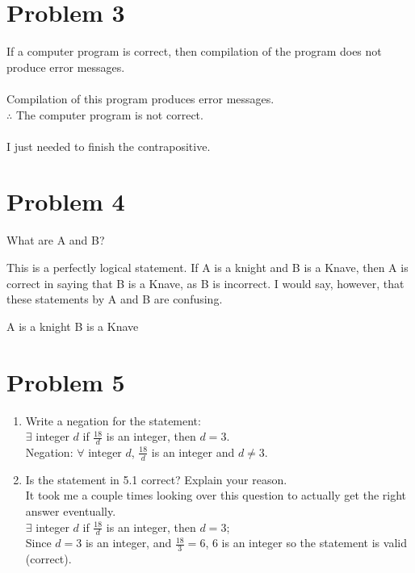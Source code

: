\documentclass[11pt]{article}
\begin{document}
\newpage

\section*{Problem 3}
    \quad If a computer program is correct, then compilation of the program does not produce error messages.\\\\
    Compilation of this program produces error messages. \\
    $\therefore$ The computer program is not correct.\\\\
    I just needed to finish the contrapositive.

\newpage

\section*{Problem 4}
\begin{center}
    What are A and B?
\end{center}
This is a perfectly logical statement. If A is a knight and B is a Knave, then A is correct in saying that B is a Knave, as B is incorrect. I would say, however, that these statements by A and B are confusing. \\
\begin{center}
    A is a knight \quad B is a Knave
\end{center}

\newpage

\section*{Problem 5}
\begin{enumerate}
    \item Write a negation for the statement:\\
    \quad $\exists$ integer $d$ if  $\frac{18}{d}$ is an integer, then $d = 3$.\\
    Negation: $\forall$ integer $d$, $\frac{18}{d}$ is an integer and $d \neq 3$. 
    \item Is the statement in 5.1 correct? Explain your reason.\\
    It took me a couple times looking over this question to actually get the right answer eventually. \\
    $\exists$ integer $d$ if  $\frac{18}{d}$ is an integer, then $d = 3$;\\
    Since $d=3$ is an integer, and $\frac{18}{3} = 6$, $6$ is an integer so the statement is valid (correct).


\end{enumerate}
\end{document}

